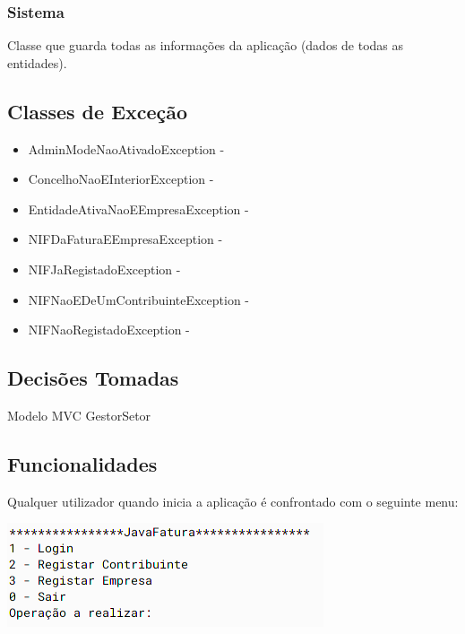 \documentclass[a4paper]{article}
\begin{document}
\subsubsection{Sistema} %

Classe que guarda todas as informações da aplicação (dados de todas as entidades).



\subsection{Classes de Exceção}
\label{Casdads}

  \begin{itemize}
  	\item{AdminModeNaoAtivadoException - } 
    \item{ConcelhoNaoEInteriorException - } 
    \item{EntidadeAtivaNaoEEmpresaException - } 
    \item{NIFDaFaturaEEmpresaException - }
    \item{NIFJaRegistadoException - } 
    \item{NIFNaoEDeUmContribuinteException - }
    \item{NIFNaoRegistadoException - }
  \end{itemize}


\subsection{Decisões Tomadas}
\label{sec:decisoes}

Modelo MVC
GestorSetor



\subsection{Funcionalidades}
\label{sec:funcionalidades}

Qualquer utilizador quando inicia a aplicação é confrontado com o seguinte menu:

	\includegraphics[width=.6\linewidth]{main_menu.png}
\end{document}
